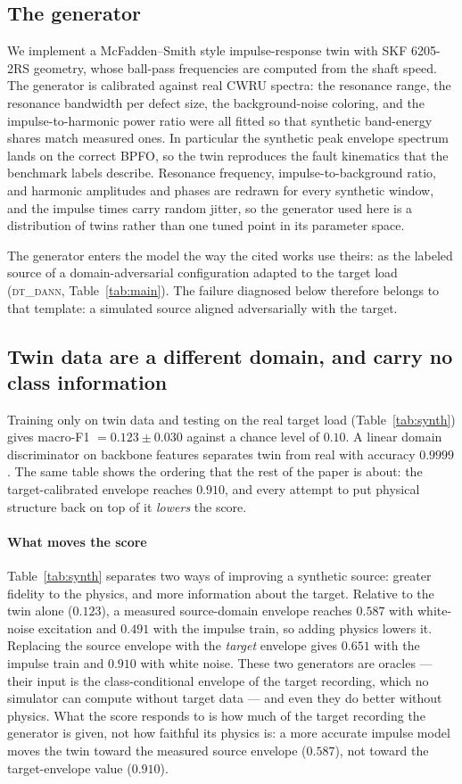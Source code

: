 \documentclass[preprint,12pt]{elsarticle}
\newcommand{\ml}[1]{\textsc{#1}}
\begin{document}
\subsection{The generator}
We implement a McFadden--Smith style impulse-response twin
\cite{randall2011rolling} with SKF 6205-2RS geometry, whose
ball-pass frequencies are computed from the shaft speed. The generator is
calibrated against real CWRU spectra: the resonance range, the resonance
bandwidth per defect size, the background-noise coloring, and the
impulse-to-harmonic power ratio were all fitted so that synthetic
band-energy shares match measured ones. In particular the synthetic peak
envelope spectrum lands on the correct BPFO, so the twin reproduces the fault
kinematics that the benchmark labels describe. Resonance frequency,
impulse-to-background ratio, and harmonic amplitudes and phases are redrawn for
every synthetic window, and the impulse times carry random jitter, so the
generator used here is a distribution of twins rather than one tuned point in
its parameter space.

The generator enters the model the way the cited works use theirs: as the
labeled source of a domain-adversarial configuration adapted to the target load
(\ml{dt\_dann}, Table~\ref{tab:main}). The failure diagnosed below therefore
belongs to that template: a simulated source aligned adversarially with the
target.

\subsection{Twin data are a different domain, and carry no class information}
Training only on twin data and testing on the real target load
(Table~\ref{tab:synth}) gives macro-F1 $=0.123 \pm 0.030$ against a chance
level of $0.10$. A linear domain discriminator on backbone features separates
twin from real with accuracy $0.9999$. The same table shows the ordering that
the rest of the paper is about: the target-calibrated envelope reaches $0.910$,
and every attempt to put physical structure back on top of it \emph{lowers}
the score.

\paragraph{What moves the score}
Table~\ref{tab:synth} separates two ways of improving a synthetic source:
greater fidelity to the physics, and more information about the target.
Relative to the twin alone ($0.123$), a measured source-domain envelope reaches
$0.587$ with white-noise excitation and $0.491$ with the impulse train, so
adding physics lowers it. Replacing the source envelope with the \emph{target}
envelope gives $0.651$ with the impulse train and $0.910$ with white noise.
These two generators are oracles --- their input is the class-conditional
envelope of the target recording, which no simulator can compute without target
data --- and even they do better without physics. What the score responds to is
how much of the target recording the generator is given, not how faithful its
physics is: a more accurate impulse model moves the twin toward the measured
source envelope ($0.587$), not toward the target-envelope value ($0.910$).
\end{document}
